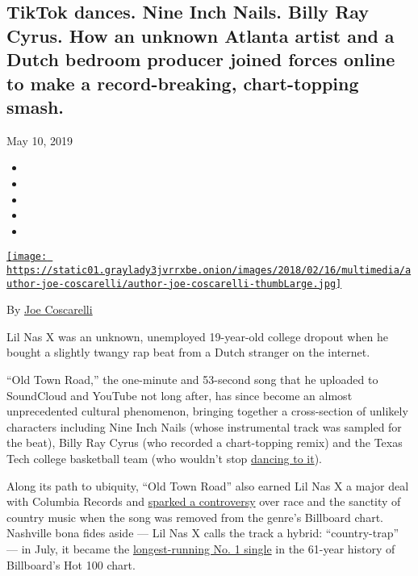 \hypertarget{tiktok-dances-nine-inch-nails-billy-ray-cyrus-how-an-unknown-atlanta-artist-and-a-dutch-bedroom-producer-joined-forces-online-to-make-a-record-breaking-chart-topping-smash-1}{%
\subsection{TikTok dances. Nine Inch Nails. Billy Ray Cyrus. How an
unknown Atlanta artist and a Dutch bedroom producer joined forces online
to make a record-breaking, chart-topping
smash.}\label{tiktok-dances-nine-inch-nails-billy-ray-cyrus-how-an-unknown-atlanta-artist-and-a-dutch-bedroom-producer-joined-forces-online-to-make-a-record-breaking-chart-topping-smash-1}}

May 10, 2019

\begin{itemize}
\item
\item
\item
\item
\item
\end{itemize}

\href{https://www.nytimes3xbfgragh.onion/by/joe-coscarelli}{\texttt{[image: https://static01.graylady3jvrrxbe.onion/images/2018/02/16/multimedia/author-joe-coscarelli/author-joe-coscarelli-thumbLarge.jpg]}}

By \href{https://www.nytimes3xbfgragh.onion/by/joe-coscarelli}{Joe
Coscarelli}

Lil Nas X was an unknown, unemployed 19-year-old college dropout when he
bought a slightly twangy rap beat from a Dutch stranger on the internet.

``Old Town Road,'' the one-minute and 53-second song that he uploaded to
SoundCloud and YouTube not long after, has since become an almost
unprecedented cultural phenomenon, bringing together a cross-section of
unlikely characters including Nine Inch Nails (whose instrumental track
was sampled for the beat), Billy Ray Cyrus (who recorded a chart-topping
remix) and the Texas Tech college basketball team (who wouldn't stop
\href{https://www.cbssports.com/g00/college-basketball/news/ncaa-tournament-championship-2019-how-old-town-road-became-texas-techs-unlikely-theme-song/}{dancing
to it}).

Along its path to ubiquity, ``Old Town Road'' also earned Lil Nas X a
major deal with Columbia Records and
\href{https://www.nytimes3xbfgragh.onion/2019/04/05/business/media/lil-nas-x-billy-ray-cyrus-billboard.html}{sparked
a controversy} over race and the sanctity of country music when the song
was removed from the genre's Billboard chart. Nashville bona fides aside
--- Lil Nas X calls the track a hybrid: ``country-trap'' --- in July, it
became the
\href{https://www.nytimes3xbfgragh.onion/2019/07/29/arts/music/lil-nas-x-old-town-road-billboard-record.html}{longest-running
No. 1 single} in the 61-year history of Billboard's Hot 100 chart.

